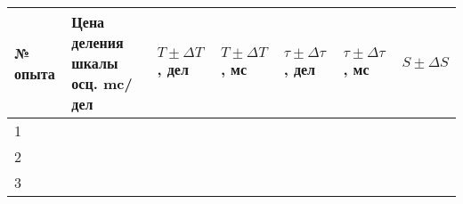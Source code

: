 \documentclass[a4paper,12pt]{article}
\begin{document}
\begin{table}
	\caption{}
	\begin{tabularx}{\textwidth}{|X|X|X|X|X|X|X|}
		\hline
		№ опыта & Цена деления шкалы осц. mc/дел & $T \pm \Delta T$, дел & $T \pm \Delta T$, мс & $\tau \pm \Delta \tau$, дел & $\tau \pm \Delta \tau$, мс & $S \pm \Delta S$ \\ \hline
		1 & & & & & & \\ \hline
		2 & & & & & & \\ \hline
		3 & & & & & & \\ \hline				
	\end{tabularx}
\end{table}
\end{document}
